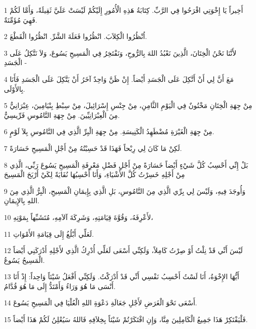 \par 1 أَخِيراً يَا إِخْوَتِي افْرَحُوا فِي الرَّبِّ. كِتَابَةُ هَذِهِ الْأُمُورِ إِلَيْكُمْ لَيْسَتْ عَلَيَّ ثَقِيلَةً، وَأَمَّا لَكُمْ فَهِيَ مُؤَمِّنَةٌ.
\par 2 اُنْظُرُوا الْكِلاَبَ. انْظُرُوا فَعَلَةَ الشَّرِّ. انْظُرُوا الْقَطْعَ.
\par 3 لأَنَّنَا نَحْنُ الْخِتَانَ، الَّذِينَ نَعْبُدُ اللهَ بِالرُّوحِ، وَنَفْتَخِرُ فِي الْمَسِيحِ يَسُوعَ، وَلاَ نَتَّكِلُ عَلَى الْجَسَدِ -
\par 4 مَعَ أَنَّ لِي أَنْ أَتَّكِلَ عَلَى الْجَسَدِ أَيْضاً. إِنْ ظَنَّ وَاحِدٌ آخَرُ أَنْ يَتَّكِلَ عَلَى الْجَسَدِ فَأَنَا بِالأَوْلَى.
\par 5 مِنْ جِهَةِ الْخِتَانِ مَخْتُونٌ فِي الْيَوْمِ الثَّامِنِ، مِنْ جِنْسِ إِسْرَائِيلَ، مِنْ سِبْطِ بِنْيَامِينَ، عِبْرَانِيٌّ مِنَ الْعِبْرَانِيِّينَ. مِنْ جِهَةِ النَّامُوسِ فَرِّيسِيٌّ.
\par 6 مِنْ جِهَةِ الْغَيْرَةِ مُضْطَهِدُ الْكَنِيسَةِ. مِنْ جِهَةِ الْبِرِّ الَّذِي فِي النَّامُوسِ بِلاَ لَوْمٍ.
\par 7 لَكِنْ مَا كَانَ لِي رِبْحاً فَهَذَا قَدْ حَسِبْتُهُ مِنْ أَجْلِ الْمَسِيحِ خَسَارَةً.
\par 8 بَلْ إِنِّي أَحْسِبُ كُلَّ شَيْءٍ أَيْضاً خَسَارَةً مِنْ أَجْلِ فَضْلِ مَعْرِفَةِ الْمَسِيحِ يَسُوعَ رَبِّي، الَّذِي مِنْ أَجْلِهِ خَسِرْتُ كُلَّ الأَشْيَاءِ، وَأَنَا أَحْسِبُهَا نُفَايَةً لِكَيْ أَرْبَحَ الْمَسِيحَ
\par 9 وَأُوجَدَ فِيهِ، وَلَيْسَ لِي بِرِّي الَّذِي مِنَ النَّامُوسِ، بَلِ الَّذِي بِإِيمَانِ الْمَسِيحِ، الْبِرُّ الَّذِي مِنَ اللهِ بِالإِيمَانِ.
\par 10 لأَعْرِفَهُ، وَقُوَّةَ قِيَامَتِهِ، وَشَرِكَةَ آلاَمِهِ، مُتَشَبِّهاً بِمَوْتِهِ،
\par 11 لَعَلِّي أَبْلُغُ إِلَى قِيَامَةِ الأَمْوَاتِ.
\par 12 لَيْسَ أَنِّي قَدْ نِلْتُ أَوْ صِرْتُ كَامِلاً، وَلَكِنِّي أَسْعَى لَعَلِّي أُدْرِكُ الَّذِي لأَجْلِهِ أَدْرَكَنِي أَيْضاً الْمَسِيحُ يَسُوعُ.
\par 13 أَيُّهَا الإِخْوَةُ، أَنَا لَسْتُ أَحْسِبُ نَفْسِي أَنِّي قَدْ أَدْرَكْتُ. وَلَكِنِّي أَفْعَلُ شَيْئاً وَاحِداً: إِذْ أَنَا أَنْسَى مَا هُوَ وَرَاءُ وَأَمْتَدُّ إِلَى مَا هُوَ قُدَّامُ.
\par 14 أَسْعَى نَحْوَ الْغَرَضِ لأَجْلِ جَعَالَةِ دَعْوَةِ اللهِ الْعُلْيَا فِي الْمَسِيحِ يَسُوعَ.
\par 15 فَلْيَفْتَكِرْ هَذَا جَمِيعُ الْكَامِلِينَ مِنَّا، وَإِنِ افْتَكَرْتُمْ شَيْئاً بِخِلاَفِهِ فَاللهُ سَيُعْلِنُ لَكُمْ هَذَا أَيْضاً.
